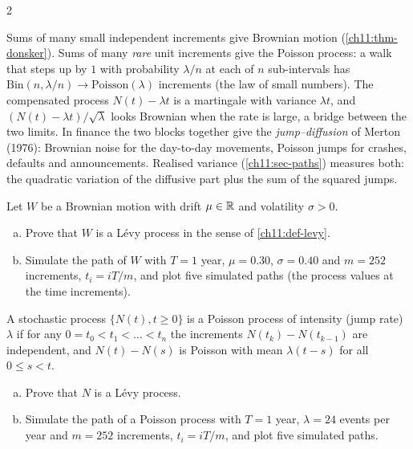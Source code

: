 \begin{paracol}{2}
\begin{intuition}
Sums of many small independent increments give Brownian motion (\cref{ch11:thm-donsker}). Sums of many \emph{rare} unit
increments give the Poisson process: a walk that steps up by $1$ with probability $\lambda/n$ at each of $n$ sub-intervals has
$\mathrm{Bin}(n,\lambda/n)\to\mathrm{Poisson}(\lambda)$ increments (the law of small numbers). The compensated process
$N(t)-\lambda t$ is a martingale with variance $\lambda t$, and $(N(t)-\lambda t)/\sqrt\lambda$ looks Brownian when the rate is large, a bridge between the two limits. In finance the two blocks together give the
\emph{jump--diffusion} of Merton (1976): Brownian noise for the day-to-day movements, Poisson jumps for crashes, defaults and announcements.
Realised variance (\cref{ch11:sec-paths}) measures both: the quadratic variation of the diffusive part plus the sum of the squared jumps.
\end{intuition}

\begin{exercise}\label{ch11:ex-levy-bm}
Let $W$ be a Brownian motion with drift $\mu\in\mathbb{R}$ and volatility $\sigma>0$.
\begin{enumerate}[(a)]
  \item Prove that $W$ is a L\'evy process in the sense of \cref{ch11:def-levy}.
  \item Simulate the path of $W$ with $T=1$ year, $\mu=0.30$, $\sigma=0.40$ and $m=252$ increments, $t_i=iT/m$, and plot five simulated paths (the process values at the time increments).
\end{enumerate}
\end{exercise}

\begin{exercise}\label{ch11:ex-levy-poisson}
A stochastic process $\{N(t),t\ge0\}$ is a Poisson process of intensity (jump rate) $\lambda$ if for any $0=t_0<t_1<\dots<t_n$ the increments $N(t_k)-N(t_{k-1})$ are independent,
and $N(t)-N(s)$ is Poisson with mean $\lambda(t-s)$ for all $0\le s<t$.
\begin{enumerate}[(a)]
  \item Prove that $N$ is a L\'evy process.
  \item Simulate the path of a Poisson process with $T=1$ year, $\lambda=24$ events per year and $m=252$ increments, $t_i=iT/m$, and plot five simulated paths.
\end{enumerate}
\end{exercise}


\end{paracol}
